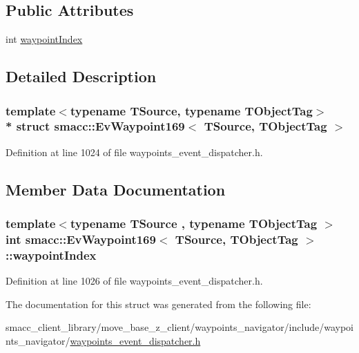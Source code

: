 \subsection*{Public Attributes}
\begin{DoxyCompactItemize}
\item 
int \hyperlink{structsmacc_1_1EvWaypoint169_acb03151a7b84f3415f7e62fe44d3a169}{waypoint\+Index}
\end{DoxyCompactItemize}


\subsection{Detailed Description}
\subsubsection*{template$<$typename T\+Source, typename T\+Object\+Tag$>$\\*
struct smacc\+::\+Ev\+Waypoint169$<$ T\+Source, T\+Object\+Tag $>$}



Definition at line 1024 of file waypoints\+\_\+event\+\_\+dispatcher.\+h.



\subsection{Member Data Documentation}
\subsubsection[{\texorpdfstring{waypoint\+Index}{waypointIndex}}]{\setlength{\rightskip}{0pt plus 5cm}template$<$typename T\+Source , typename T\+Object\+Tag $>$ int {\bf smacc\+::\+Ev\+Waypoint169}$<$ T\+Source, T\+Object\+Tag $>$\+::waypoint\+Index}\hypertarget{structsmacc_1_1EvWaypoint169_acb03151a7b84f3415f7e62fe44d3a169}{}\label{structsmacc_1_1EvWaypoint169_acb03151a7b84f3415f7e62fe44d3a169}


Definition at line 1026 of file waypoints\+\_\+event\+\_\+dispatcher.\+h.



The documentation for this struct was generated from the following file\+:\begin{DoxyCompactItemize}
\item 
smacc\+\_\+client\+\_\+library/move\+\_\+base\+\_\+z\+\_\+client/waypoints\+\_\+navigator/include/waypoints\+\_\+navigator/\hyperlink{waypoints__event__dispatcher_8h}{waypoints\+\_\+event\+\_\+dispatcher.\+h}\end{DoxyCompactItemize}
